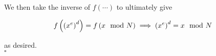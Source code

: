 \documentclass[../CryptoFinal.tex]{subfiles}
\begin{document}
\begin{flushleft}
We then take the inverse of $f \left( \cdots \right)$ to ultimately give

\begin{align}
  f \left( \left( x^e \right)^d \right) = f \left( x \mod N \right) \; \Longrightarrow \; \left( x^e \right)^d = x \mod N  \notag
\end{align}

as desired. \\
$\square$






\end{flushleft}
\end{document}
